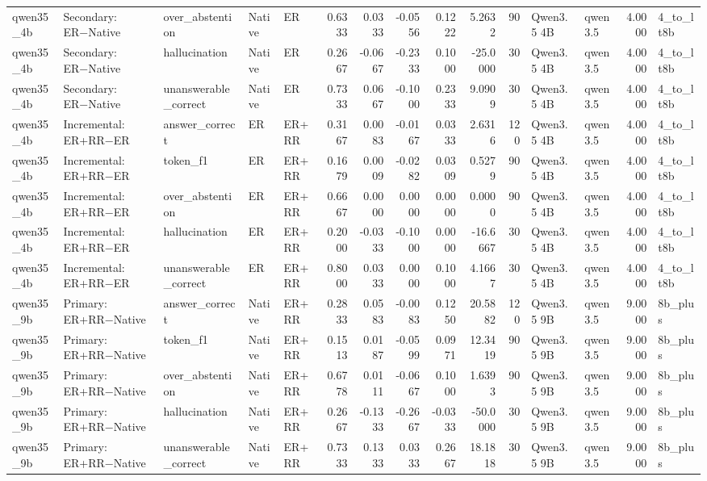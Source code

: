 \begin{tabular}{lllllrrrrrrllrl}
qwen35_4b & Secondary: ER−Native & over_abstention & Native & ER & 0.6333 & 0.0333 & -0.0556 & 0.1222 & 5.2632 & 90 & Qwen3.5 4B & qwen3.5 & 4.0000 & 4_to_lt8b \\
qwen35_4b & Secondary: ER−Native & hallucination & Native & ER & 0.2667 & -0.0667 & -0.2333 & 0.1000 & -25.0000 & 30 & Qwen3.5 4B & qwen3.5 & 4.0000 & 4_to_lt8b \\
qwen35_4b & Secondary: ER−Native & unanswerable_correct & Native & ER & 0.7333 & 0.0667 & -0.1000 & 0.2333 & 9.0909 & 30 & Qwen3.5 4B & qwen3.5 & 4.0000 & 4_to_lt8b \\
qwen35_4b & Incremental: ER+RR−ER & answer_correct & ER & ER+RR & 0.3167 & 0.0083 & -0.0167 & 0.0333 & 2.6316 & 120 & Qwen3.5 4B & qwen3.5 & 4.0000 & 4_to_lt8b \\
qwen35_4b & Incremental: ER+RR−ER & token_f1 & ER & ER+RR & 0.1679 & 0.0009 & -0.0282 & 0.0309 & 0.5279 & 90 & Qwen3.5 4B & qwen3.5 & 4.0000 & 4_to_lt8b \\
qwen35_4b & Incremental: ER+RR−ER & over_abstention & ER & ER+RR & 0.6667 & 0.0000 & 0.0000 & 0.0000 & 0.0000 & 90 & Qwen3.5 4B & qwen3.5 & 4.0000 & 4_to_lt8b \\
qwen35_4b & Incremental: ER+RR−ER & hallucination & ER & ER+RR & 0.2000 & -0.0333 & -0.1000 & 0.0000 & -16.6667 & 30 & Qwen3.5 4B & qwen3.5 & 4.0000 & 4_to_lt8b \\
qwen35_4b & Incremental: ER+RR−ER & unanswerable_correct & ER & ER+RR & 0.8000 & 0.0333 & 0.0000 & 0.1000 & 4.1667 & 30 & Qwen3.5 4B & qwen3.5 & 4.0000 & 4_to_lt8b \\
qwen35_9b & Primary: ER+RR−Native & answer_correct & Native & ER+RR & 0.2833 & 0.0583 & -0.0083 & 0.1250 & 20.5882 & 120 & Qwen3.5 9B & qwen3.5 & 9.0000 & 8b_plus \\
qwen35_9b & Primary: ER+RR−Native & token_f1 & Native & ER+RR & 0.1513 & 0.0187 & -0.0599 & 0.0971 & 12.3419 & 90 & Qwen3.5 9B & qwen3.5 & 9.0000 & 8b_plus \\
qwen35_9b & Primary: ER+RR−Native & over_abstention & Native & ER+RR & 0.6778 & 0.0111 & -0.0667 & 0.1000 & 1.6393 & 90 & Qwen3.5 9B & qwen3.5 & 9.0000 & 8b_plus \\
qwen35_9b & Primary: ER+RR−Native & hallucination & Native & ER+RR & 0.2667 & -0.1333 & -0.2667 & -0.0333 & -50.0000 & 30 & Qwen3.5 9B & qwen3.5 & 9.0000 & 8b_plus \\
qwen35_9b & Primary: ER+RR−Native & unanswerable_correct & Native & ER+RR & 0.7333 & 0.1333 & 0.0333 & 0.2667 & 18.1818 & 30 & Qwen3.5 9B & qwen3.5 & 9.0000 & 8b_plus \\

\end{tabular}
